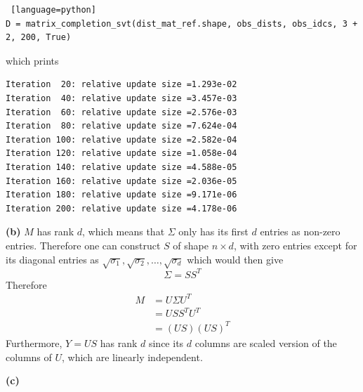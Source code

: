 \documentclass[a4paper, 12pt]{article}
\begin{document}
\begin{solution}
\begin{lstlisting} [language=python]
D = matrix_completion_svt(dist_mat_ref.shape, obs_dists, obs_idcs, 3 + 2, 200, True)
\end{lstlisting}
which prints
\begin{lstlisting}
Iteration  20: relative update size =1.293e-02
Iteration  40: relative update size =3.457e-03
Iteration  60: relative update size =2.576e-03
Iteration  80: relative update size =7.624e-04
Iteration 100: relative update size =2.582e-04
Iteration 120: relative update size =1.058e-04
Iteration 140: relative update size =4.588e-05
Iteration 160: relative update size =2.036e-05
Iteration 180: relative update size =9.171e-06
Iteration 200: relative update size =4.178e-06
\end{lstlisting}
\textbf{(b)} $M$ has rank $d$, which means that $\Sigma$ only has its first $d$ entries as non-zero entries. Therefore one can construct $S$ of shape $n \times d$, with zero entries except for its diagonal entries as $\sqrt{\sigma_1}, \sqrt{\sigma_2}, \ldots, \sqrt{\sigma_d}$
which would then give \[
\Sigma = SS^T
\]
Therefore \begin{align*}
M &= U\Sigma U^T \\
&= US S^T U^T \\
&= (US)(US)^T
\end{align*}
Furthermore, $Y = US$ has rank $d$ since its $d$ columns are scaled version of the columns of $U$, which are linearly independent.

\textbf{(c)}
\end{solution}
\end{document}
